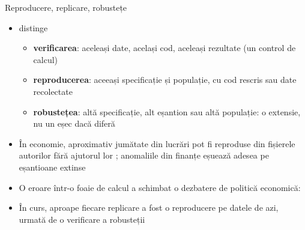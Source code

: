 \begin{frame}{Reproducere, replicare, robustețe}
\itemsize{\small}
\begin{itemize}
    \item {} distinge
    \begin{itemize}
        \item \textbf{verificarea}: aceleași date, același cod, aceleași rezultate (un control de calcul)
        \item \textbf{reproducerea}: aceeași specificație și populație, cu cod rescris sau date recolectate
        \item \textbf{robustețea}: altă specificație, alt eșantion sau altă populație: o extensie, nu un eșec dacă diferă
    \end{itemize}
    \item În economie, aproximativ jumătate din lucrări pot fi reproduse din fișierele autorilor fără ajutorul lor ; anomaliile din finanțe eșuează adesea pe eșantioane extinse 
    \item O eroare într-o foaie de calcul a schimbat o dezbatere de politică economică: 
    \item În curs, aproape fiecare replicare a fost o reproducere pe datele de azi, urmată de o verificare a robusteții
\end{itemize}
\end{frame}

